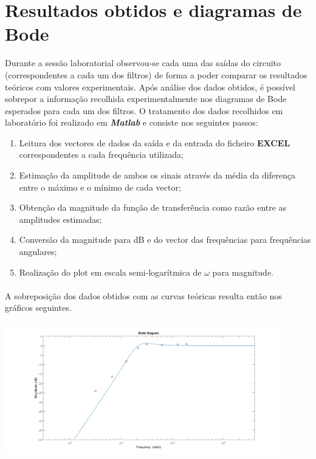 \documentclass[a4paper,11pt]{report}
\begin{document}
\section{Resultados obtidos e diagramas de Bode}
Durante a sessão laboratorial observou-se cada uma das saídas do circuito (correspondentes a cada um dos filtros) de forma a poder comparar os resultados teóricos com valores experimentais. Após análise dos dados obtidos, é possível sobrepor a informação recolhida experimentalmente nos diagramas de Bode esperados para cada um dos filtros. O tratamento dos dados recolhidos em laboratório foi realizado em \textbf{\emph{Matlab}} e consiste nos seguintes passos:
\begin{enumerate}
\item Leitura dos vectores de dados da saída e da entrada do ficheiro \textbf{EXCEL} correspondentes a cada frequência utilizada;
\item Estimação da amplitude de ambos os sinais através da média da diferença entre o máximo e o mínimo de cada vector;
\item Obtenção da magnitude da função de transferência como razão entre as amplitudes estimadas;
\item Conversão da magnitude para dB e do vector das frequências para frequências angulares;
\item Realização do plot em escala semi-logarítmica de $\omega$ para magnitude.
\end{enumerate}
\paragraph{}
A sobreposição dos dados obtidos com as curvas teóricas resulta então nos gráficos seguintes.
\begin{center}
     \includegraphics[angle=0,width=0.9\textwidth]{KHNT1exp.png}
     \label{fig:KHNT1exp}
     \end{center}
\end{document}
